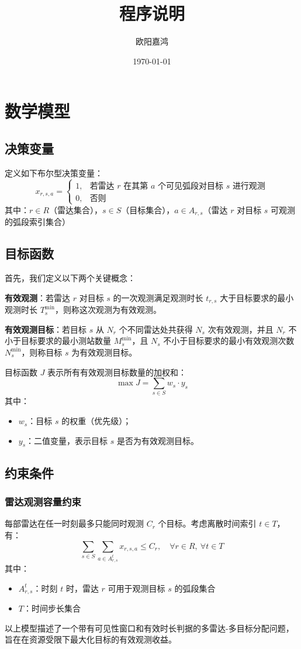 \documentclass[openany,12pt,UTF8]{ctexart}
\title{程序说明}
\author{欧阳嘉鸿}
\date{\today}
\begin{document}
\maketitle
\newpage
\tableofcontents
\newpage
\section{数学模型}

\subsection{决策变量}
定义如下布尔型决策变量：
$$
    x_{r,s,a} =
    \begin{cases}
        1, & \text{若雷达 } r \text{ 在其第 } a \text{ 个可见弧段对目标 } s \text{ 进行观测} \\
        0, & \text{否则}
    \end{cases}
$$
其中：$r \in R$（雷达集合），$s \in S$（目标集合），$a \in A_{r,s}$（雷达 $r$ 对目标 $s$ 可观测的弧段索引集合）

\subsection{目标函数}
首先，我们定义以下两个关键概念：

\textbf{有效观测}：若雷达 $r$ 对目标 $s$ 的一次观测满足观测时长 $t_{r,s}$ 大于目标要求的最小观测时长 $T_s^{\min}$，则称这次观测为有效观测。

\textbf{有效观测目标}：若目标 $s$ 从 $N_r$ 个不同雷达处共获得 $N_s$ 次有效观测，并且 $N_r$ 不小于目标要求的最小测站数量 $M_s^{\min}$，且 $N_s$ 不小于目标要求的最小有效观测次数 $N_s^{\min}$，则称目标 $s$ 为有效观测目标。

目标函数 $J$ 表示所有有效观测目标数量的加权和：
$$
    \max J = \sum_{s \in S} w_s \cdot y_s
$$
其中：
\begin{itemize}
    \item $w_s$：目标 $s$ 的权重（优先级）；
    \item $y_s$：二值变量，表示目标 $s$ 是否为有效观测目标。
\end{itemize}

\subsection{约束条件}

\subsubsection{雷达观测容量约束}
每部雷达在任一时刻最多只能同时观测 $C_r$ 个目标。考虑离散时间索引 $t \in T$，有：
$$
    \sum_{s \in S} \sum_{a \in A_{r,s}^t} x_{r,s,a} \leq C_r, \quad \forall r \in R,\ \forall t \in T
$$
其中：
\begin{itemize}
    \item $A_{r,s}^t$：时刻 $t$ 时，雷达 $r$ 可用于观测目标 $s$ 的弧段集合
    \item $T$：时间步长集合
\end{itemize}

以上模型描述了一个带有可见性窗口和有效时长判据的多雷达-多目标分配问题，旨在在资源受限下最大化目标的有效观测收益。
\end{document}
